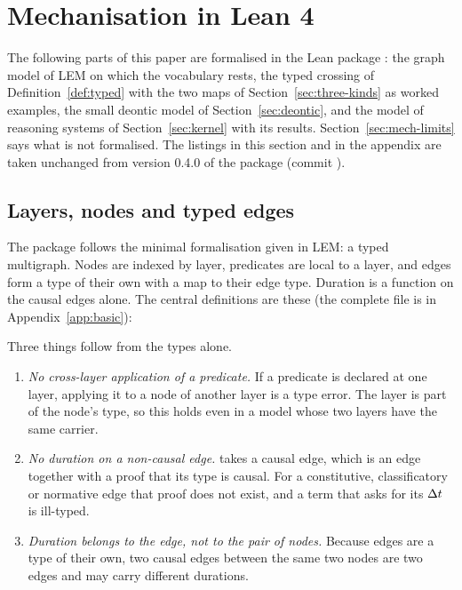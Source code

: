 \section{Mechanisation in Lean 4}
\label{sec:mech}

The following parts of this paper are formalised in the Lean package 
\citep{kreinzlemlean}: the graph model of LEM on which the vocabulary rests, the typed
crossing of Definition~\ref{def:typed} with the two maps of
Section~\ref{sec:three-kinds} as worked examples, the small deontic model of
Section~\ref{sec:deontic}, and the model of reasoning systems of
Section~\ref{sec:kernel} with its results. Section~\ref{sec:mech-limits} says what is
not formalised. The listings in this section and in the appendix are taken unchanged
from version 0.4.0 of the package (commit ).

\subsection{Layers, nodes and typed edges}

The package follows the minimal formalisation given in LEM: a typed multigraph. Nodes are
indexed by layer, predicates are local to a layer, and edges form a type of their own
with a map to their edge type. Duration is a function on the causal edges alone. The
central definitions are these (the complete file is in
Appendix~\ref{app:basic}):



\noindent
Three things follow from the types alone.

\begin{enumerate}[label=(\arabic*)]
  \item \emph{No cross-layer application of a predicate.} If a predicate is declared at
        one layer, applying it to a node of another layer is a type error. The layer is
        part of the node's type, so this holds even in a model whose two layers have the
        same carrier.
  \item \emph{No duration on a non-causal edge.}  takes a
        causal edge, which is an edge together with a proof that its type is causal. For
        a constitutive, classificatory or normative edge that proof does not exist, and
        a term that asks for its $\Delta t$ is ill-typed.
  \item \emph{Duration belongs to the edge, not to the pair of nodes.} Because edges are
        a type of their own, two causal edges between the same two nodes are two edges
        and may carry different durations.
\end{enumerate}

